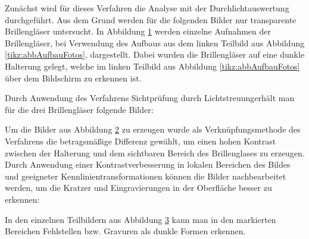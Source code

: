 Zunächst wird für dieses Verfahren die Analyse mit der Durchlichtauswertung durchgeführt.
Aus dem Grund werden für die folgenden Bilder nur transparente Brillengläser untersucht.
In Abbildung \ref{tikz:abbStreifenaufnahmen} werden einzelne Aufnahmen der Brillengläser, bei Verwendung des Aufbaus aus dem linken Teilbild aus Abbildung \ref{tikz:abbAufbauFotos}, dargestellt.
Dabei wurden die Brillengläser auf eine dunkle Halterung gelegt, welche im linken Teilbild aus Abbildung \ref{tikz:abbAufbauFotos} über dem Bildschirm zu erkennen ist.

{
	\begin{figure}[H]
		\centering
		
		\label{tikz:abbStreifenaufnahmen}
	\end{figure}
}


\noindent
Durch Anwendung des Verfahrens \glqq Sichtprüfung durch Lichtstreuung\grqq erhält man für die drei Brillengläser folgende Bilder:

{
	\begin{figure}[H]
		\centering
		
		\label{tikz:abbCombinePatternPictures}
	\end{figure}
}

\noindent
Um die Bilder aus Abbildung \ref{tikz:abbCombinePatternPictures} zu erzeugen wurde als Verknüpfungsmethode des  Verfahrens die betragsmäßige Differenz gewählt, um einen hohen Kontrast zwischen der Halterung und dem sichtbaren Bereich des Brillenglases zu erzeugen.
Durch Anwendung einer Kontrastverbesserung in lokalen Bereichen des Bildes und geeigneter Kennlinientransformationen können die Bilder nachbearbeitet werden, um die Kratzer und Eingravierungen in der Oberfläche besser zu erkennen:

{
	\begin{figure}[H]
		\centering
		
		\label{tikz:abbNachbearbeitung}
	\end{figure}
}

\noindent
In den einzelnen Teilbildern aus Abbildung \ref{tikz:abbNachbearbeitung} kann man in den markierten Bereichen Fehlstellen bzw. Gravuren als dunkle Formen erkennen.